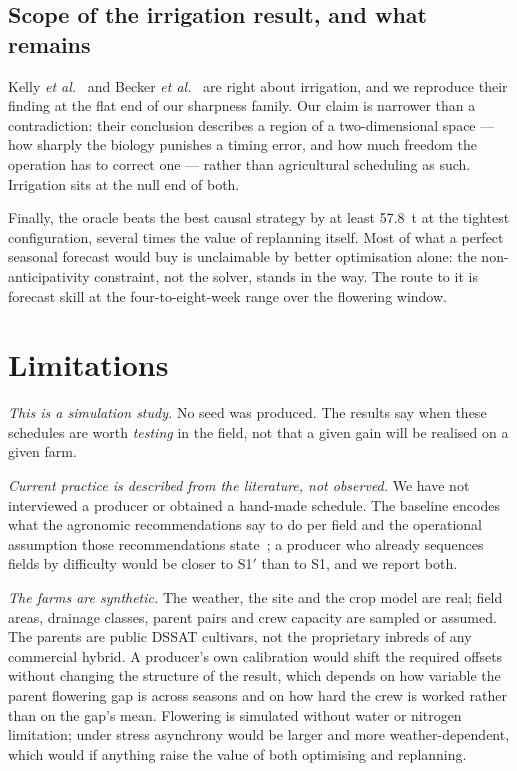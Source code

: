 \documentclass[10pt,twocolumn]{article}
\begin{document}
\subsection{Scope of the irrigation result, and what remains}

Kelly \textit{et al.}~\cite{kelly2023} and Becker \textit{et
al.}~\cite{becker2026} are right about irrigation, and we reproduce
their finding at the flat end of our sharpness family. Our claim is
narrower than a contradiction: their conclusion describes a region of
a two-dimensional space --- how sharply the biology punishes a timing
error, and how much freedom the operation has to correct one ---
rather than agricultural scheduling as such. Irrigation sits at the
null end of both.

Finally, the oracle beats the best causal strategy by at least 57.8~t
at the tightest configuration, several times the value of replanning
itself. Most of what a perfect seasonal forecast would buy is
unclaimable by better optimisation alone: the non-anticipativity
constraint, not the solver, stands in the way. The route to it is
forecast skill at the four-to-eight-week range over the flowering
window.


\section{Limitations}
\label{sec:limits}

\emph{This is a simulation study.} No seed was produced. The results say
when these schedules are worth \emph{testing} in the field, not that a given
gain will be realised on a given farm.

\emph{Current practice is described from the literature, not observed.}
We have not interviewed a producer or obtained a hand-made schedule. The
baseline encodes what the agronomic recommendations say to do per field and
the operational assumption those recommendations state~\cite{chassaigne2021};
a producer who already sequences fields by difficulty would be closer to
S1$'$ than to S1, and we report both.

\emph{The farms are synthetic.} The weather, the site and the crop model are
real; field areas, drainage classes, parent pairs and crew capacity are
sampled or assumed. The parents are public DSSAT cultivars, not the
proprietary inbreds of any commercial hybrid. A producer's own calibration
would shift the required offsets without changing the structure of the
result, which depends on how variable the parent flowering gap is across
seasons and on how hard the crew is worked rather than on the gap's mean.
Flowering is simulated without water or nitrogen limitation; under stress
asynchrony would be larger and more weather-dependent, which would if
anything raise the value of both optimising and replanning.
\end{document}
